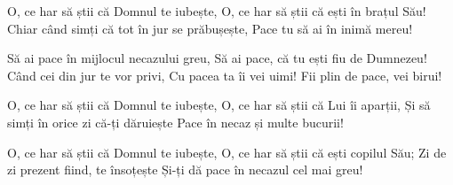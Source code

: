 \beginverse
O, ce har să știi că Domnul te iubește,
O, ce har să știi că ești în brațul Său!
Chiar când simți că tot în jur se prăbușește,
Pace tu să ai în inimă mereu!
\endverse

\beginchorus
Să ai pace în mijlocul necazului greu,
Să ai pace, că tu ești fiu de Dumnezeu!
Când cei din jur te vor privi,
Cu pacea ta îi vei uimi!
Fii plin de pace, vei birui!
\endchorus

\beginverse
O, ce har să știi că Domnul te iubește,
O, ce har să știi că Lui îi aparții,
Și să simți în orice zi că-ți dăruiește
Pace în necaz și multe bucurii!
\endverse

\beginverse
O, ce har să știi că Domnul te iubește,
O, ce har să știi că ești copilul Său;
Zi de zi prezent fiind, te însoțește
Și-ți dă pace în necazul cel mai greu!
\endverse
\endsong